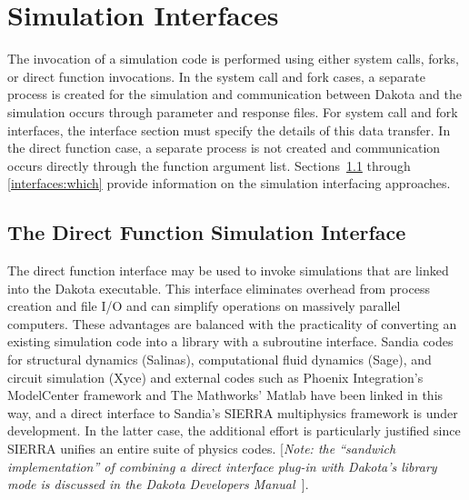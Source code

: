 \section{Simulation Interfaces}\label{interfaces:sim}

The invocation of a simulation code is performed using either system
calls, forks, or direct function invocations. In the system call and
fork cases, a separate process is created for the simulation and
communication between Dakota and the simulation occurs through
parameter and response files. For system call and fork interfaces,
the interface section must specify the details of this data
transfer.  In the direct function case, a separate process is not
created and communication occurs directly through the function
argument list.  Sections~\ref{interfaces:direct} through
\ref{interfaces:which} provide information on the simulation
interfacing approaches.

\subsection{The Direct Function Simulation Interface}\label{interfaces:direct}

The direct function interface may be used to invoke
simulations that are linked into the Dakota executable. This
interface eliminates overhead from process creation and file I/O and
can simplify operations on massively parallel computers. These
advantages are balanced with the practicality of converting an
existing simulation code into a library with a subroutine
interface. Sandia codes for structural dynamics (Salinas),
computational fluid dynamics (Sage), and circuit simulation (Xyce) and
external codes such as Phoenix Integration's ModelCenter framework and
The Mathworks' Matlab have been linked in this way, and a direct
interface to Sandia's SIERRA multiphysics framework is under
development. In the latter case, the additional effort is particularly
justified since SIERRA unifies an entire suite of physics codes.
[\emph{Note: the ``sandwich implementation'' of combining a direct
interface plug-in with Dakota's library mode is discussed in the
Dakota Developers Manual~\cite{DevMan}}].

